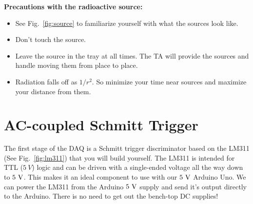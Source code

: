 \documentclass[12pt]{article}
\begin{document}
\noindent
{\bf Precautions with the radioactive source:}
\begin{itemize}
\item See Fig.~\ref{fig:source} to familiarize yourself with what the sources look like.
\item Don't touch the source.
\item Leave the source in the tray at all times.  The TA will provide the sources and handle moving them from place to place.
\item Radiation falls off as $1/r^2$.  So minimize your time near sources and maximize your distance from them.
\end{itemize}

\section{AC-coupled Schmitt Trigger}

The first stage of the DAQ is a Schmitt trigger discriminator based on the LM311 (See Fig.~\ref{fig:lm311}) that you will build yourself.  The LM311 is intended for TTL ($5~V$) logic and can be driven with a single-ended voltage all the way down to $5~\rm V$.  This makes it an ideal component to use with our $5~\rm V$ Arduino Uno.  We can power the LM311 from the Arduino $5~\rm V$ supply and send it's output directly to the Arduino.  There is no need to get out the bench-top DC supplies!
\end{document}
